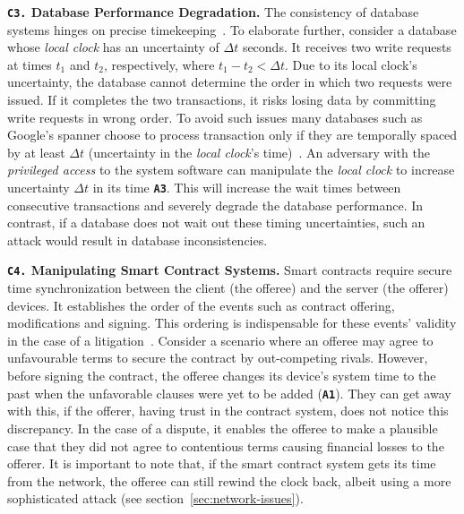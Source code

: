 \noindent\textbf{\texttt{C3.} Database Performance Degradation.} The consistency of database systems hinges on precise timekeeping~\cite{huygens}. To elaborate further, consider a database whose \textit{local clock} has an uncertainty of $\Delta t$ seconds. It receives two write requests at times $t_1$ and $t_2$, respectively, where $t_1-t_2 < \Delta t$. Due to its local clock's uncertainty, the database cannot determine the order in which two requests were issued. If it completes the two transactions, it risks losing data by committing write requests in wrong order. To avoid such issues many databases such as Google's spanner choose to process transaction only if they are temporally spaced by at least  $\Delta t$ (uncertainty in the \textit{local clock}'s time)~\cite{google-spanner}. An adversary with the \textit{privileged access} to the system software can manipulate the \textit{local clock} to increase uncertainty $\Delta t$ in its time \textbf{\texttt{A3}}. This will increase the wait times between consecutive transactions and severely degrade the database performance. In contrast, if a database does not wait out these timing uncertainties, such an attack would result in database inconsistencies.

\noindent\textbf{\texttt{C4.} Manipulating Smart Contract Systems.} Smart contracts require secure time synchronization between the client (the offeree) and the server (the offerer) devices. It establishes the order of the events such as contract offering, modifications and signing. This ordering is indispensable for these events' validity in the case of a litigation~\cite{smart-contract-tabellion}. Consider a scenario where an offeree may agree to unfavourable terms to secure the contract by out-competing rivals. However, before signing the contract, the offeree changes its device's system time to the past when the unfavorable clauses were yet to be added (\textbf{\texttt{A1}}). They can get away with this, if the offerer, having trust in the contract system, does not notice this discrepancy. In the case of a dispute, it enables the offeree to make a plausible case that they did not agree to contentious terms causing financial losses to the offerer. It is important to note that, if the smart contract system gets its time from the network, the offeree can still rewind the clock back, albeit using a more sophisticated attack (see section~\ref{sec:network-issues}). 


